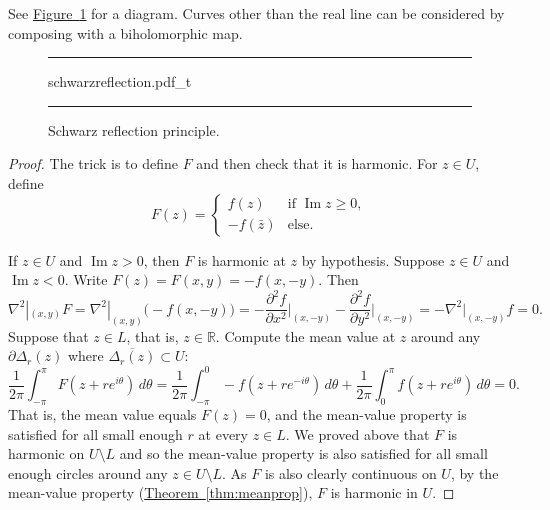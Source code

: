 \documentclass[12pt,openany]{book}
\renewcommand{\Im}{\operatorname{Im}}
\newcommand{\R}{{\mathbb{R}}}
\theoremstyle{plain}
\theoremstyle{remark}
\theoremstyle{definition}
\newenvironment{myfig}{%
\begin{figure}[h!t]
\noindent\rule{\textwidth}{0.5pt}\vspace{12pt}\par\centering}%
{\par\noindent\rule{\textwidth}{0.5pt}
\end{figure}}
\theoremstyle{exercise}
\theoremstyle{example}
\newcommand{\figureref}[1]{\hyperref[#1]{Figure~\ref*{#1}}}
\newcommand{\thmref}[1]{\hyperref[#1]{Theorem~\ref*{#1}}}
\begin{document}
See \figureref{fig:schwarzreflection} for a diagram.
Curves other than the real line can be considered by composing with a
biholomorphic map.

\begin{myfig}
{schwarzreflection.pdf_t}
\caption{Schwarz reflection principle.\label{fig:schwarzreflection}}
\end{myfig}

\begin{proof}
The trick is to define $F$ and then
check that it is harmonic.
For $z \in U$, define
\begin{equation*}
F(z) =
\begin{cases}
f(z) & \text{if } \Im z \geq 0, \\
-f(\bar{z}) & \text{else} .
\end{cases}
\end{equation*}

If $z \in U$ and $\Im z > 0$, then $F$ is harmonic at $z$ by hypothesis.
Suppose $z \in U$ and $\Im z < 0$.  Write $F(z) = F(x,y) = -f(x,-y)$.  Then
\begin{equation*}
\nabla^2|_{(x,y)} F
=
\nabla^2|_{(x,y)} \bigl( -f(x,-y) \bigr)
=
- \frac{\partial^2 f}{\partial x^2}\Big|_{(x,-y)}
- \frac{\partial^2 f}{\partial y^2}\Big|_{(x,-y)}
=
- \nabla^2|_{(x,-y)} f = 0 .
\end{equation*}
Suppose that $z \in L$, that is, $z \in \R$.
Compute the mean value at $z$ around any
$\partial \Delta_r(z)$ where $\overline{\Delta_r(z)} \subset U$:
\begin{equation*}
\frac{1}{2\pi} \int_{-\pi}^{\pi} F(z+re^{i\theta})\, d\theta
=
\frac{1}{2\pi} \int_{-\pi}^{0} -f(z+re^{-i\theta})\, d\theta
+
\frac{1}{2\pi} \int_{0}^{\pi} f(z+re^{i\theta})\, d\theta
=
0 .
\end{equation*}
That is, the mean value equals $F(z) = 0$,
and the mean-value property is satisfied for all small enough
$r$ at every $z \in L$.
We proved above that $F$ is harmonic on $U \setminus L$ and
so the mean-value property
is also satisfied for all small enough circles
around any $z \in U \setminus L$.
As $F$ is also clearly continuous on $U$,
by the mean-value property (\thmref{thm:meanprop}), $F$ is harmonic in $U$.
\end{proof}
\end{document}
